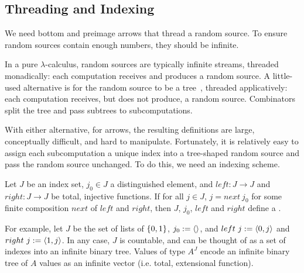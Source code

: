 \documentclass{llncs}
\begin{document}
\subsection{Threading and Indexing}
\label{sec:threading-and-indexing}

We need bottom and preimage arrows that thread a random source.
To ensure random sources contain enough numbers, they should be infinite.

In a pure $\lambda$-calculus, random sources are typically infinite streams, threaded monadically: each computation receives and produces a random source.
A little-used alternative is for the random source to be a tree~\cite{cit:mcallester-2008tr-random-world}, threaded applicatively: each computation receives, but does not produce, a random source.
Combinators split the tree and pass subtrees to subcomputations.

With either alternative, for arrows, the resulting definitions are large, conceptually difficult, and hard to manipulate.
Fortunately, it is relatively easy to assign each subcomputation a unique index into a tree-shaped random source and pass the random source unchanged.
To do this, we need an indexing scheme.

\begin{definition}
Let $J$ be an index set, $j_0 \in J$ a distinguished element, and $left : J \to J$ and $right : J \to J$ be total, injective functions. If for all $j \in J$, $j = next~j_0$ for some finite composition $next$ of $left$ and $right$, then $J$, $j_0$, $left$ and $right$ define a .
\end{definition}

For example, let $J$ be the set of lists of $\{{0,1}\}$, $j_0 := \langle{}\rangle$, and $left~j := \langle{0,j}\rangle$ and $right~j := \langle{1,j}\rangle$.
In any case, $J$ is countable, and can be thought of as a set of indexes into an infinite binary tree.
Values of type $A^J$ encode an infinite binary tree of $A$ values as an infinite vector (i.e. total, extensional function).
\end{document}
